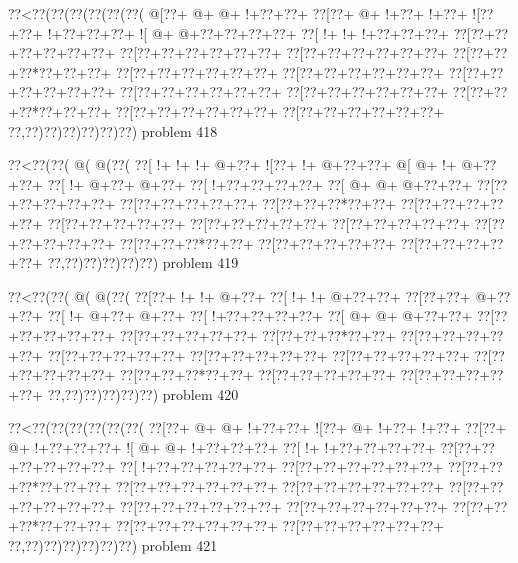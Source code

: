 \vbox{\vbox{\goo
\0??<\0??(\0??(\0??(\0??(\0??(\0??(
\- @[\0??+\- @+\- @+\- !+\0??+\0??+
\0??[\0??+\- @+\- !+\0??+\- !+\0??+
\- ![\0??+\0??+\- !+\0??+\0??+\0??+
\- ![\- @+\- @+\0??+\0??+\0??+\0??+
\0??[\- !+\- !+\- !+\0??+\0??+\0??+
\0??[\0??+\0??+\0??+\0??+\0??+\0??+
\0??[\0??+\0??+\0??+\0??+\0??+\0??+
\0??[\0??+\0??+\0??+\0??+\0??+\0??+
\0??[\0??+\0??+\0??*\0??+\0??+\0??+
\0??[\0??+\0??+\0??+\0??+\0??+\0??+
\0??[\0??+\0??+\0??+\0??+\0??+\0??+
\0??[\0??+\0??+\0??+\0??+\0??+\0??+
\0??[\0??+\0??+\0??+\0??+\0??+\0??+
\0??[\0??+\0??+\0??+\0??+\0??+\0??+
\0??[\0??+\0??+\0??*\0??+\0??+\0??+
\0??[\0??+\0??+\0??+\0??+\0??+\0??+
\0??[\0??+\0??+\0??+\0??+\0??+\0??+
\0??,\0??)\0??)\0??)\0??)\0??)\0??)
}
\hfil problem 418\hfil\break
}

\vbox{\vbox{\goo
\0??<\0??(\0??(\- @(\- @(\0??(
\0??[\- !+\- !+\- !+\- @+\0??+
\- ![\0??+\- !+\- @+\0??+\0??+
\- @[\- @+\- !+\- @+\0??+\0??+
\0??[\- !+\- @+\0??+\- @+\0??+
\0??[\- !+\0??+\0??+\0??+\0??+
\0??[\- @+\- @+\- @+\0??+\0??+
\0??[\0??+\0??+\0??+\0??+\0??+
\0??[\0??+\0??+\0??+\0??+\0??+
\0??[\0??+\0??+\0??*\0??+\0??+
\0??[\0??+\0??+\0??+\0??+\0??+
\0??[\0??+\0??+\0??+\0??+\0??+
\0??[\0??+\0??+\0??+\0??+\0??+
\0??[\0??+\0??+\0??+\0??+\0??+
\0??[\0??+\0??+\0??+\0??+\0??+
\0??[\0??+\0??+\0??*\0??+\0??+
\0??[\0??+\0??+\0??+\0??+\0??+
\0??[\0??+\0??+\0??+\0??+\0??+
\0??,\0??)\0??)\0??)\0??)\0??)
}
\hfil problem 419\hfil\break
}

\vbox{\vbox{\goo
\0??<\0??(\0??(\- @(\- @(\0??(
\0??[\0??+\- !+\- !+\- @+\0??+
\0??[\- !+\- !+\- @+\0??+\0??+
\0??[\0??+\0??+\- @+\0??+\0??+
\0??[\- !+\- @+\0??+\- @+\0??+
\0??[\- !+\0??+\0??+\0??+\0??+
\0??[\- @+\- @+\- @+\0??+\0??+
\0??[\0??+\0??+\0??+\0??+\0??+
\0??[\0??+\0??+\0??+\0??+\0??+
\0??[\0??+\0??+\0??*\0??+\0??+
\0??[\0??+\0??+\0??+\0??+\0??+
\0??[\0??+\0??+\0??+\0??+\0??+
\0??[\0??+\0??+\0??+\0??+\0??+
\0??[\0??+\0??+\0??+\0??+\0??+
\0??[\0??+\0??+\0??+\0??+\0??+
\0??[\0??+\0??+\0??*\0??+\0??+
\0??[\0??+\0??+\0??+\0??+\0??+
\0??[\0??+\0??+\0??+\0??+\0??+
\0??,\0??)\0??)\0??)\0??)\0??)
}
\hfil problem 420\hfil\break
}

\vbox{\vbox{\goo
\0??<\0??(\0??(\0??(\0??(\0??(\0??(
\0??[\0??+\- @+\- @+\- !+\0??+\0??+
\- ![\0??+\- @+\- !+\0??+\- !+\0??+
\0??[\0??+\- @+\- !+\0??+\0??+\0??+
\- ![\- @+\- @+\- !+\0??+\0??+\0??+
\0??[\- !+\- !+\0??+\0??+\0??+\0??+
\0??[\0??+\0??+\0??+\0??+\0??+\0??+
\0??[\- !+\0??+\0??+\0??+\0??+\0??+
\0??[\0??+\0??+\0??+\0??+\0??+\0??+
\0??[\0??+\0??+\0??*\0??+\0??+\0??+
\0??[\0??+\0??+\0??+\0??+\0??+\0??+
\0??[\0??+\0??+\0??+\0??+\0??+\0??+
\0??[\0??+\0??+\0??+\0??+\0??+\0??+
\0??[\0??+\0??+\0??+\0??+\0??+\0??+
\0??[\0??+\0??+\0??+\0??+\0??+\0??+
\0??[\0??+\0??+\0??*\0??+\0??+\0??+
\0??[\0??+\0??+\0??+\0??+\0??+\0??+
\0??[\0??+\0??+\0??+\0??+\0??+\0??+
\0??,\0??)\0??)\0??)\0??)\0??)\0??)
}
\hfil problem 421\hfil\break
}

